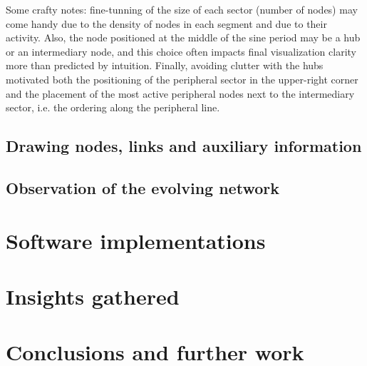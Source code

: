 \documentclass[runningheads]{llncs}
\begin{document}
Some crafty notes: fine-tunning of the size of each sector (number of nodes) may come handy due to the density of nodes in each segment and due to their activity. Also, the node positioned at the middle of the sine period may be a hub or an intermediary node, and this choice often impacts final visualization clarity more than predicted by intuition.
Finally, 
avoiding clutter with the hubs motivated both 
the positioning of the peripheral sector in the upper-right corner and
the placement of the most active peripheral nodes next to the intermediary sector, i.e. the ordering along the peripheral line.

\subsection{Drawing nodes, links and auxiliary information}
\subsection{Observation of the evolving network}

\section{Software implementations}\label{sec:imp}
\section{Insights gathered}\label{sec:ins}
\section{Conclusions and further work}\label{sec:con}
%
%
%


%
% 
% 
% 
% 
\end{document}
